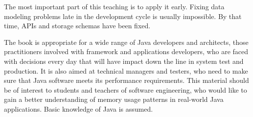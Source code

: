 The most important part of this teaching is to apply it early.
Fixing data modeling problems late in the development cycle is usually
impossible. By that time, APIs and storage schemas have been fixed.

The book is appropriate for a wide range of Java developers and architects,
those practitioners involved with framework and applications developers, who are
faced with decisions every day that will have impact down the line in system test and production.
It is also aimed at technical managers and testers, who need to make sure that
Java software meets its performance requirements.  This material should be of
interest to students and teachers of software engineering, who would like to
gain a better understanding of memory usage patterns in real-world Java
applications. Basic knowledge of Java is assumed.

